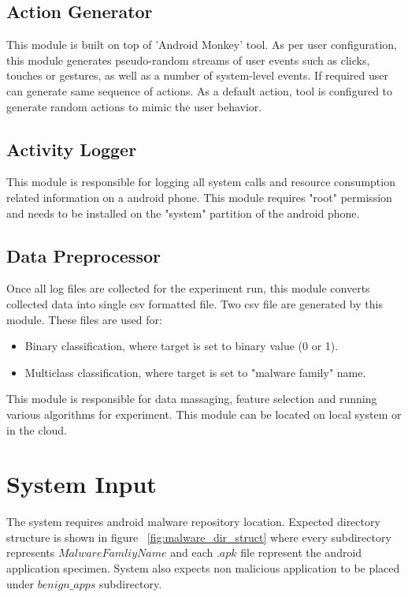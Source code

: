 \subsection{Action Generator}
\label{Action Generator}
This module is built on top of 'Android Monkey' tool. As per user configuration, this module generates pseudo-random streams of user events such as clicks, touches or gestures, as well as a number of system-level events. If required user can generate same sequence of actions. As a default action, tool is configured to generate random actions to mimic the user behavior.
\subsection{Activity Logger}
\label{Activity Logger}
This module is responsible for logging all system calls and resource consumption related information on a android phone. This module requires "root" permission and needs to be installed on the "system" partition of the android phone.
\subsection{Data Preprocessor}
\label{Data Preprocessor}
Once all log files are collected for the experiment run, this module converts collected data into single csv formatted file. Two csv file are generated by this module. These files are used for:
\begin{itemize}
\item Binary classification, where target is set to binary value (0 or 1).
\item Multiclass classification, where target is set to "malware family" name.
\end{itemize}
\label{Knowledge Generation}
This module is responsible for data massaging, feature selection and running various algorithms for experiment. This module can be located on local system or in the cloud.

\section{System Input}
\label{System Input}
The system requires android malware repository location. Expected directory structure is shown in figure ~\ref{fig:malware_dir_struct} where every subdirectory represents \(Malware Famliy Name\) and each \(.apk\) file represent the android application specimen. System also expects non malicious application to be placed under \(benign\_apps\) subdirectory.

